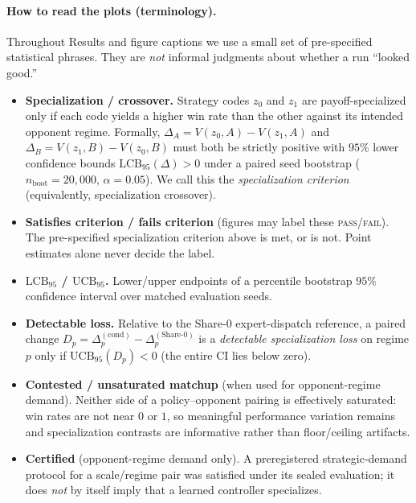 \documentclass{article}
\begin{document}
\paragraph{How to read the plots (terminology).}
Throughout Results and figure captions we use a small set of pre-specified
statistical phrases. They are \emph{not} informal judgments about whether a run
``looked good.''

\begin{itemize}
  \item \textbf{Specialization / crossover.}
  Strategy codes $z_0$ and $z_1$ are payoff-specialized only if each code
  yields a higher win rate than the other against its intended opponent regime.
  Formally,
  $\Delta_A=V(z_0,A)-V(z_1,A)$ and $\Delta_B=V(z_1,B)-V(z_0,B)$ must both be
  strictly positive with $95\%$ lower confidence bounds
  $\mathrm{LCB}_{95}(\Delta)>0$ under a paired seed bootstrap
  ($n_{\mathrm{boot}}=20{,}000$, $\alpha=0.05$). We call this the
  \emph{specialization criterion} (equivalently, specialization crossover).

  \item \textbf{Satisfies criterion / fails criterion}
  (figures may label these \textsc{pass}/\textsc{fail}).
  The pre-specified specialization criterion above is met, or is not.
  Point estimates alone never decide the label.

  \item \textbf{$\mathrm{LCB}_{95}$ / $\mathrm{UCB}_{95}$.}
  Lower/upper endpoints of a percentile bootstrap $95\%$ confidence interval
  over matched evaluation seeds.

  \item \textbf{Detectable loss.}
  Relative to the Share-0 expert-dispatch reference, a paired change
  $D_p=\Delta_p^{(\mathrm{cond})}-\Delta_p^{(\mathrm{Share\textrm{-}0})}$ is a
  \emph{detectable specialization loss} on regime $p$ only if
  $\mathrm{UCB}_{95}(D_p)<0$ (the entire CI lies below zero).

  \item \textbf{Contested / unsaturated matchup}
  (when used for opponent-regime demand).
  Neither side of a policy--opponent pairing is effectively saturated: win rates
  are not near $0$ or $1$, so meaningful performance variation remains and
  specialization contrasts are informative rather than floor/ceiling artifacts.

  \item \textbf{Certified} (opponent-regime demand only).
  A preregistered strategic-demand protocol for a scale/regime pair was
  satisfied under its sealed evaluation; it does \emph{not} by itself imply
  that a learned controller specializes.
\end{itemize}
\end{document}
